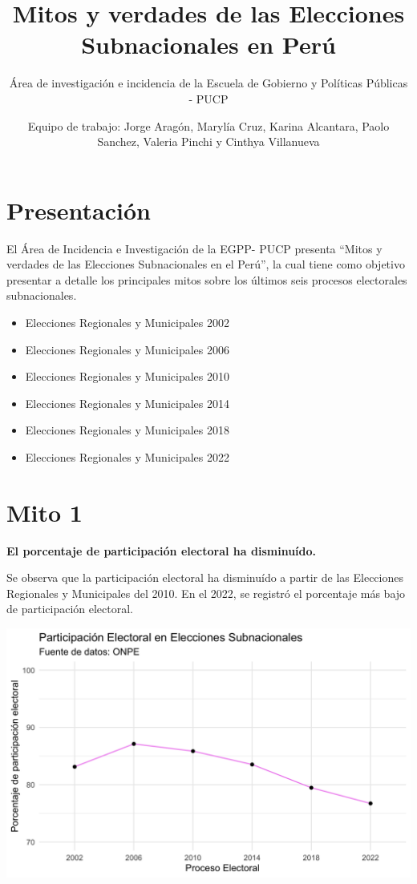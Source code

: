 \documentclass[
]{book}
\title{Mitos y verdades de las Elecciones Subnacionales en Perú}
\author{Área de investigación e incidencia de la Escuela de Gobierno y Políticas Públicas - PUCP}
\date{Equipo de trabajo: Jorge Aragón, Marylía Cruz, Karina Alcantara, Paolo Sanchez, Valeria Pinchi y Cinthya Villanueva}
\theoremstyle{definition}
\theoremstyle{definition}
\theoremstyle{definition}
\theoremstyle{definition}
\theoremstyle{remark}
\begin{document}
\maketitle

{
\setcounter{tocdepth}{1}
\tableofcontents
}
\hypertarget{presentaciuxf3n}{%
\chapter{Presentación}\label{presentaciuxf3n}}

El Área de Incidencia e Investigación de la EGPP- PUCP presenta ``Mitos y verdades de las Elecciones Subnacionales en el Perú'', la cual tiene como objetivo presentar a detalle los principales mitos sobre los últimos seis procesos electorales subnacionales.

\begin{itemize}
\item
  Elecciones Regionales y Municipales 2002
\item
  Elecciones Regionales y Municipales 2006
\item
  Elecciones Regionales y Municipales 2010
\item
  Elecciones Regionales y Municipales 2014
\item
  Elecciones Regionales y Municipales 2018
\item
  Elecciones Regionales y Municipales 2022
\end{itemize}

\hypertarget{mito-1}{%
\chapter{Mito 1}\label{mito-1}}

\textbf{El porcentaje de participación electoral ha disminuído.}

Se observa que la participación electoral ha disminuído a partir de las Elecciones Regionales y Municipales del 2010. En el 2022, se registró el porcentaje más bajo de participación electoral.

\includegraphics[width=19.15in]{mito1_1}
\end{document}
